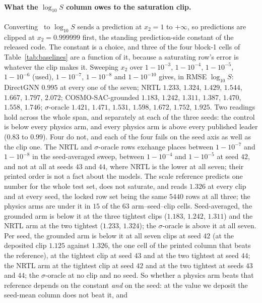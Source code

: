 \paragraph{What the $\log_{10}S$ column owes to the saturation clip.} Converting \lnx\ to
$\log_{10}S$ sends a prediction at $x_2=1$ to $+\infty$, so predictions are clipped at
$x_2=0.999999$ first, the standing prediction-side
constant of the released code. The constant is a choice, and three of the four block-1 cells of
Table~\ref{tab:baselines} are a function of it, because a saturating row's error is whatever the clip
makes it. Sweeping $x_2$ over $1-10^{-3}$, $1-10^{-4}$, $1-10^{-5}$, $1-10^{-6}$ (used), $1-10^{-7}$,
$1-10^{-8}$ and $1-10^{-10}$ gives, in RMSE $\log_{10}S$: DirectGNN $0.995$ at every one of the
seven; NRTL $1.233$, $1.324$, $1.429$, $1.544$, $1.667$, $1.797$, $2.072$; COSMO-SAC-grounded
$1.183$, $1.242$, $1.311$, $1.387$, $1.470$, $1.558$, $1.746$; $\sigma$-oracle $1.421$, $1.471$,
$1.531$, $1.598$, $1.672$, $1.752$, $1.925$. Two readings hold across the whole span, and separately
at each of the three seeds: the control
is below every physics arm, and every physics arm is above every published leader ($0.83$ to $0.99$).
Four do not, and each of the four fails on the seed axis as well as the clip one. The NRTL and
$\sigma$-oracle rows exchange places between \mbox{$1-10^{-7}$} and \mbox{$1-10^{-8}$} in the seed-averaged sweep,
between $1-10^{-4}$ and $1-10^{-5}$ at seed $42$, and not at all at seeds $43$ and $44$, where NRTL
is the lower at all seven; their printed order is not a fact about the models. The scale reference predicts
one number for the whole test set, does not saturate, and reads $1.326$ at every clip and at every
seed, the locked row set being the same $5440$ rows at all three; the physics arms are under it in
$15$ of the $63$ arm--seed--clip cells. Seed-averaged, the grounded arm is below it at the three tightest clips
($1.183$, $1.242$, $1.311$) and the NRTL arm at the two tightest ($1.233$, $1.324$); the
$\sigma$-oracle is above it at all seven. Per seed, the grounded arm is below it at all seven clips
at seed $42$ (at the deposited clip $1.125$ against $1.326$, the one cell of the printed column that
beats the reference), at the tightest clip at seed $43$ and at the two tightest at seed $44$; the
NRTL arm at the tightest clip at seed $42$ and at the two tightest at seeds $43$ and $44$; the
$\sigma$-oracle at no clip and no seed. So whether a physics arm beats that reference depends on the
constant \emph{and} on the seed: at the value we deposit the seed-mean column does not beat it, and
